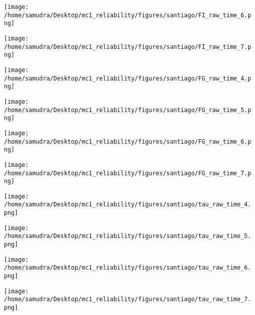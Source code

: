 \documentclass[a4paper]{article}
\def\lthtmlcheckvsize{\ifdim\ht\sizebox<\vsize 
  \ifdim\wd\sizebox<\hsize\expandafter\hfill\fi \expandafter\vfill
  \else\expandafter\vss\fi}%
\begin{document}
{\newpage\clearpage
{}%
\texttt{[image: /home/samudra/Desktop/mc1\_reliability/figures/santiago/FI\_raw\_time\_6.png]}%
\lthtmlpictureZ
\lthtmlcheckvsize\clearpage}

{\newpage\clearpage
{}%
\texttt{[image: /home/samudra/Desktop/mc1\_reliability/figures/santiago/FI\_raw\_time\_7.png]}%
\lthtmlpictureZ
\lthtmlcheckvsize\clearpage}

{\newpage\clearpage
{}%
\texttt{[image: /home/samudra/Desktop/mc1\_reliability/figures/santiago/FG\_raw\_time\_4.png]}%
\lthtmlpictureZ
\lthtmlcheckvsize\clearpage}

{\newpage\clearpage
{}%
\texttt{[image: /home/samudra/Desktop/mc1\_reliability/figures/santiago/FG\_raw\_time\_5.png]}%
\lthtmlpictureZ
\lthtmlcheckvsize\clearpage}

{\newpage\clearpage
{}%
\texttt{[image: /home/samudra/Desktop/mc1\_reliability/figures/santiago/FG\_raw\_time\_6.png]}%
\lthtmlpictureZ
\lthtmlcheckvsize\clearpage}

{\newpage\clearpage
{}%
\texttt{[image: /home/samudra/Desktop/mc1\_reliability/figures/santiago/FG\_raw\_time\_7.png]}%
\lthtmlpictureZ
\lthtmlcheckvsize\clearpage}

{\newpage\clearpage
{}%
\texttt{[image: /home/samudra/Desktop/mc1\_reliability/figures/santiago/tau\_raw\_time\_4.png]}%
\lthtmlpictureZ
\lthtmlcheckvsize\clearpage}

{\newpage\clearpage
{}%
\texttt{[image: /home/samudra/Desktop/mc1\_reliability/figures/santiago/tau\_raw\_time\_5.png]}%
\lthtmlpictureZ
\lthtmlcheckvsize\clearpage}

{\newpage\clearpage
{}%
\texttt{[image: /home/samudra/Desktop/mc1\_reliability/figures/santiago/tau\_raw\_time\_6.png]}%
\lthtmlpictureZ
\lthtmlcheckvsize\clearpage}

{\newpage\clearpage
{}%
\texttt{[image: /home/samudra/Desktop/mc1\_reliability/figures/santiago/tau\_raw\_time\_7.png]}%
\lthtmlpictureZ
\lthtmlcheckvsize\clearpage}
\end{document}
